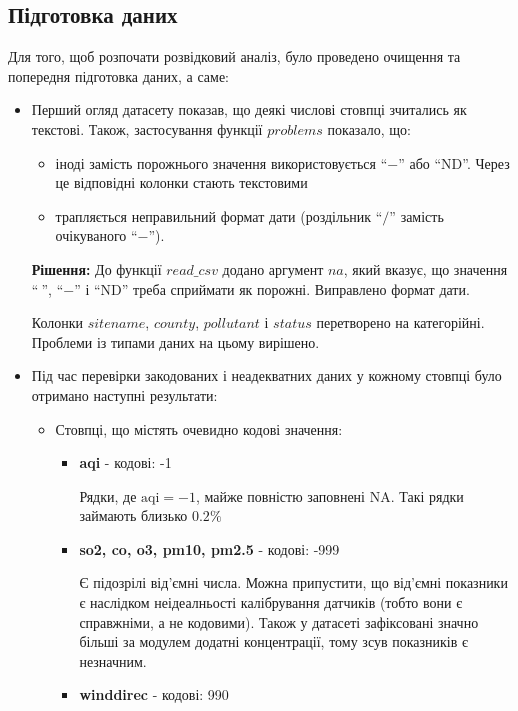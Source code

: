 \documentclass{article}
\begin{document}
\subsection{Підготовка даних}
Для того, щоб розпочати розвідковий аналіз, було проведено очищення та попередня підготовка даних, а саме: 
\begin{itemize}
    \item Перший огляд датасету показав, що деякі числові стовпці зчитались як текстові. 
    Також, застосування функції $problems$ показало, що:
        \begin{itemize}
            \item іноді замість порожнього значення використовується ``$-$'' або ``ND''. Через це відповідні колонки стають текстовими
            \item трапляється неправильний формат дати (роздільник ``$/$'' замість очікуваного ``$-$'').
        \end{itemize}
   \textbf{Рішення:} До функції $read\_csv$ додано аргумент $na$, який вказує, що значення ``$ \ $'', ``$-$'' і ``ND'' треба сприймати як порожні. Виправлено формат дати.
   
   Колонки $sitename$, $county$, $pollutant$ і $status$ перетворено на категорійні. Проблеми із типами даних на цьому вирішено.
   
   \newpage
   
    \item Під час перевірки закодованих і неадекватних даних у кожному стовпці було отримано наступні результати: 
         \begin{itemize}
             \item Стовпці, що містять очевидно кодові значення:
             \begin{itemize}
                \item \textbf{aqi} - кодові: -1
                
                Рядки, де $\text{aqi} = -1$, майже повністю заповнені NA. Такі рядки займають близько $0.2\%$
                \item \textbf{so2, co, o3, pm10, pm2.5}  - кодові: -999
                
                Є підозрілі від'ємні числа. Можна припустити, що від'ємні показники є наслідком неідеалньості калібрування датчиків (тобто вони є справжніми, а не кодовими). Також у датасеті зафіксовані значно більші за модулем додатні концентрації, тому зсув показників є незначним.
                \item \textbf{winddirec} - кодові: 990
             \end{itemize}
             

\end{itemize}
\end{itemize}
\end{document}
